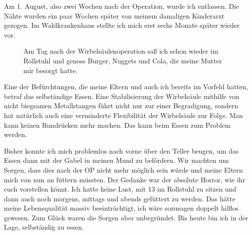 \documentclass[fontsize=14pt,a4paper,headinclude,DIV=calc,automark]{scrbook}
\begin{document}
Am 1. August, also zwei Wochen nach der Operation, wurde ich entlassen. Die Nähte wurden ein paar Wochen später von meinem damaligen Kinderarzt gezogen. Im Waldkrankenhaus stellte ich mich erst sechs Monate später wieder vor.

\setlength{\fboxsep}{0pt}    %
\setlength{\fboxrule}{0.2pt} %
\begin{figure}[H]
    \centering
    \caption{Am Tag nach der Wirbelsäulenoperation saß ich schon wieder im Rollstuhl und genoss Burger, Nuggets und Cola, die meine Mutter mir besorgt hatte.}
    \label{fig:skoliose-op-burger}
\end{figure}

Eine der Befürchtungen, die meine Eltern und auch ich bereits im Vorfeld hatten, betraf das selbständige Essen. Eine Stabilisierung der Wirbelsäule mithilfe von nicht biegsamen Metallstangen führt nicht nur zur einer Begradigung, sondern hat natürlich auch eine verminderte Flexibilität der Wirbelsäule zur Folge. Man kann keinen Rundrücken mehr machen. Das kann beim Essen zum Problem werden.

Bisher konnte ich mich problemlos nach vorne über den Teller beugen, um das Essen dann mit der Gabel in meinen Mund zu befördern. Wir machten uns Sorgen, dass dies nach der OP nicht mehr möglich sein würde und meine Eltern mich von nun an füttern müssten. Der Gedanke war der absolute Horror, wie ihr euch vorstellen könnt. Ich hatte keine Lust, mit 13 im Rollstuhl zu sitzen und dann auch noch morgens, mittags und abends gefüttert zu werden. Das hätte meine Lebensqualität massiv beeinträchtigt, ich wäre sozusagen doppelt hilflos gewesen. Zum Glück waren die Sorgen aber unbegründet. Bis heute bin ich in der Lage, selbständig zu essen.
\end{document}
